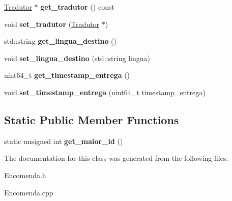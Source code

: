 \begin{DoxyCompactItemize}
\item 
\hypertarget{class_encomenda_a50c1aefd950ca5852e93beec8882db70}{\hyperlink{class_tradutor}{Tradutor} $\ast$ {\bfseries get\-\_\-tradutor} () const }\label{class_encomenda_a50c1aefd950ca5852e93beec8882db70}

\item 
\hypertarget{class_encomenda_af70d8f2344fbae033ed079dfb7350b5a}{void {\bfseries set\-\_\-tradutor} (\hyperlink{class_tradutor}{Tradutor} $\ast$)}\label{class_encomenda_af70d8f2344fbae033ed079dfb7350b5a}

\item 
\hypertarget{class_encomenda_a3b9689429c6ae78580421a96742f9687}{std\-::string {\bfseries get\-\_\-lingua\-\_\-destino} ()}\label{class_encomenda_a3b9689429c6ae78580421a96742f9687}

\item 
\hypertarget{class_encomenda_af8b12f8fba9c65a937f60ed81f9e0770}{void {\bfseries set\-\_\-lingua\-\_\-destino} (std\-::string lingua)}\label{class_encomenda_af8b12f8fba9c65a937f60ed81f9e0770}

\item 
\hypertarget{class_encomenda_a14dd37345213a30a428457f9b5df874d}{uint64\-\_\-t {\bfseries get\-\_\-timestamp\-\_\-entrega} ()}\label{class_encomenda_a14dd37345213a30a428457f9b5df874d}

\item 
\hypertarget{class_encomenda_a894c2ddbe25e0fa49f19fe35134ce3ba}{void {\bfseries set\-\_\-timestamp\-\_\-entrega} (uint64\-\_\-t timestamp\-\_\-entrega)}\label{class_encomenda_a894c2ddbe25e0fa49f19fe35134ce3ba}

\end{DoxyCompactItemize}
\subsection*{Static Public Member Functions}
\begin{DoxyCompactItemize}
\item 
\hypertarget{class_encomenda_a94777b2fe00d586c409b81167e6ee808}{static unsigned int {\bfseries get\-\_\-maior\-\_\-id} ()}\label{class_encomenda_a94777b2fe00d586c409b81167e6ee808}

\end{DoxyCompactItemize}


The documentation for this class was generated from the following files\-:\begin{DoxyCompactItemize}
\item 
Encomenda.\-h\item 
Encomenda.\-cpp\end{DoxyCompactItemize}
